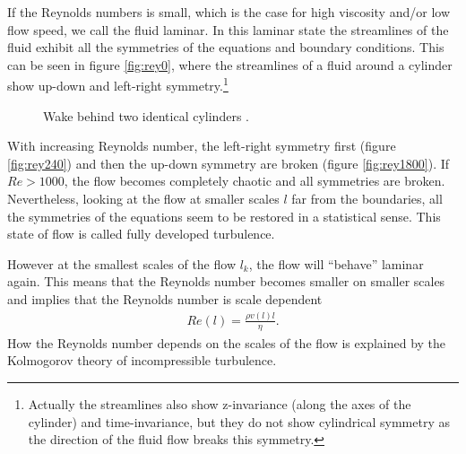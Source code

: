 If the Reynolds numbers is small, which is the case for high viscosity and/or
low flow speed, we call the fluid laminar. In this laminar state the streamlines
of the fluid exhibit all the symmetries of the equations and boundary
conditions. This can be seen in figure \ref{fig:rey0}, where the streamlines of
a fluid around a cylinder show up-down and left-right symmetry.\footnote{
Actually the streamlines also show z-invariance (along the axes of the cylinder)
and time-invariance, but they do not show cylindrical symmetry as the direction
of the fluid flow breaks this symmetry.} 

\begin{figure}[tp]
	\centering
	\caption{Wake behind two identical cylinders \citep{Frisch1995}.}
\end{figure}


With increasing Reynolds number,
the left-right symmetry first (figure \;\ref{fig:rey240}) and then the up-down
symmetry are broken (figure \;\ref{fig:rey1800}). If $Re > 1000$, the flow
becomes completely chaotic and all symmetries are broken. Nevertheless, looking
at the flow at smaller scales $l$ far from the boundaries, all the symmetries of
the equations seem to be restored in a statistical sense. This state of flow is
called fully developed turbulence.

However at the smallest scales of the flow $l_k$,
the flow will ``behave'' laminar again. This means that the Reynolds
number becomes smaller on smaller scales and implies that the Reynolds number is
scale dependent
\begin{align}
Re(l)=\frac{\rho v(l) l}{\eta}. 
\end{align}
How the Reynolds number depends on the scales of the flow is explained by the
Kolmogorov theory of incompressible turbulence.

